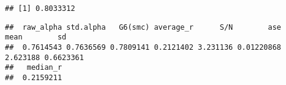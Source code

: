 \documentclass[
]{article}
\newenvironment{Shaded}{\begin{snugshade}}{\end{snugshade}}
\newcommand{\AttributeTok}[1]{\textcolor[rgb]{0.77,0.63,0.00}{#1}}
\newcommand{\ConstantTok}[1]{\textcolor[rgb]{0.00,0.00,0.00}{#1}}
\newcommand{\DecValTok}[1]{\textcolor[rgb]{0.00,0.00,0.81}{#1}}
\newcommand{\FunctionTok}[1]{\textcolor[rgb]{0.00,0.00,0.00}{#1}}
\newcommand{\NormalTok}[1]{#1}
\newcommand{\OtherTok}[1]{\textcolor[rgb]{0.56,0.35,0.01}{#1}}
\newcommand{\SpecialCharTok}[1]{\textcolor[rgb]{0.00,0.00,0.00}{#1}}
\begin{document}
\begin{verbatim}
## [1] 0.8033312
\end{verbatim}

\begin{Shaded}
\end{Shaded}

\begin{verbatim}
##  raw_alpha std.alpha   G6(smc) average_r      S/N        ase     mean        sd
##  0.7614543 0.7636569 0.7809141 0.2121402 3.231136 0.01220868 2.623188 0.6623361
##   median_r
##  0.2159211
\end{verbatim}

\begin{Shaded}
\end{Shaded}
\end{document}
